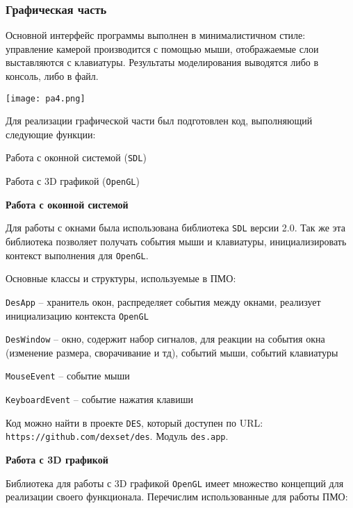 \newpage
\subsubsection{Графическая часть}

Основной интерфейс программы выполнен в минималистичном стиле:
управление камерой производится с помощью мыши, отображаемые слои выставляются с клавиатуры.
Результаты моделирования выводятся либо в консоль, либо в файл.

\vspace{1em}

\texttt{[image: pa4.png]}

Для реализации графической части был подготовлен код, выполняющий следующие функции:

\begin{mintemize}
\item Работа с оконной системой (\verb|SDL|)
\item Работа с 3D графикой (\verb|OpenGL|)
\end{mintemize}

\textbf{Работа с оконной системой}

Для работы с окнами была использована библиотека \verb|SDL| версии 2.0.
Так же эта библиотека позволяет получать события мыши и клавиатуры,
инициализировать контекст выполнения для \verb|OpenGL|.

Основные классы и структуры, используемые в ПМО:
\begin{mintemize}
\item \verb|DesApp| -- хранитель окон, распределяет события между окнами, реализует
    инициализацию контекста \verb|OpenGL|
\item \verb|DesWindow| -- окно, содержит набор сигналов, для реакции на события окна
    (изменение размера, сворачивание и тд), событий мыши, событий клавиатуры
\item \verb|MouseEvent| -- событие мыши
\item \verb|KeyboardEvent| -- событие нажатия клавиши
\end{mintemize}

Код можно найти в проекте \verb|DES|, который доступен по
\linebreak URL: \verb|https://github.com/dexset/des|.
Модуль \verb|des.app|.

\textbf{Работа с 3D графикой}

Библиотека для работы с 3D графикой \verb|OpenGL| имеет множество концепций для реализации
своего функционала. Перечислим использованные для работы ПМО:

